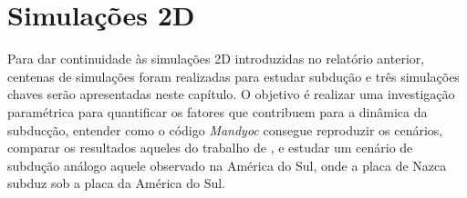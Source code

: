 \chapter{Simulações 2D}
\label{simulacoes}

Para dar continuidade às simulações 2D introduzidas no relatório anterior, centenas de simulações foram realizadas para estudar subdução e três simulações chaves serão apresentadas neste capítulo. O objetivo é realizar uma investigação paramétrica para quantificar os fatores que contribuem para a dinâmica da subducção, entender como o código \textit{Mandyoc} \citep{sacek2022mandyoc} consegue reproduzir os cenários, comparar os resultados aqueles do trabalho de \citet{strak2021thermo}, e estudar um cenário de subdução análogo aquele observado na América do Sul, onde a placa de Nazca subduz sob a placa da América do Sul.





